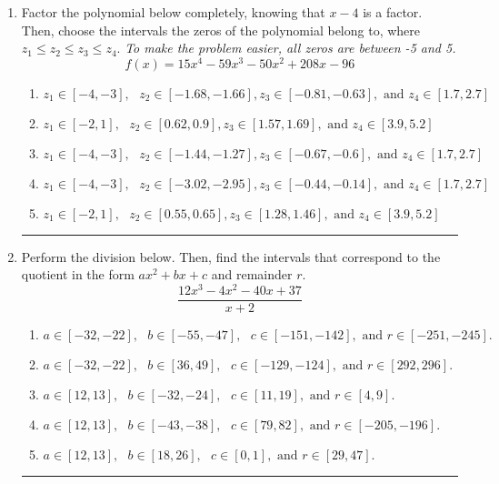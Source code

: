 \documentclass[14pt]{extbook}
\newcommand{\litem}[1]{\item#1\hspace*{-1cm}\rule{\textwidth}{0.4pt}}
\begin{document}
\begin{enumerate}
{\begin{enumerate}[label=\Alph*.]
\end{enumerate} }
\litem{
Factor the polynomial below completely, knowing that $x -4$ is a factor. Then, choose the intervals the zeros of the polynomial belong to, where $z_1 \leq z_2 \leq z_3 \leq z_4$. \textit{To make the problem easier, all zeros are between -5 and 5.}\[ f(x) = 15x^{4} -59 x^{3} -50 x^{2} +208 x -96 \]\begin{enumerate}[label=\Alph*.]
\item \( z_1 \in [-4, -3], \text{   }  z_2 \in [-1.68, -1.66], z_3 \in [-0.81, -0.63], \text{   and   } z_4 \in [1.7, 2.7] \)
\item \( z_1 \in [-2, 1], \text{   }  z_2 \in [0.62, 0.9], z_3 \in [1.57, 1.69], \text{   and   } z_4 \in [3.9, 5.2] \)
\item \( z_1 \in [-4, -3], \text{   }  z_2 \in [-1.44, -1.27], z_3 \in [-0.67, -0.6], \text{   and   } z_4 \in [1.7, 2.7] \)
\item \( z_1 \in [-4, -3], \text{   }  z_2 \in [-3.02, -2.95], z_3 \in [-0.44, -0.14], \text{   and   } z_4 \in [1.7, 2.7] \)
\item \( z_1 \in [-2, 1], \text{   }  z_2 \in [0.55, 0.65], z_3 \in [1.28, 1.46], \text{   and   } z_4 \in [3.9, 5.2] \)

\end{enumerate} }
\litem{
Perform the division below. Then, find the intervals that correspond to the quotient in the form $ax^2+bx+c$ and remainder $r$.\[ \frac{12x^{3} -4 x^{2} -40 x + 37}{x + 2} \]\begin{enumerate}[label=\Alph*.]
\item \( a \in [-32, -22], \text{   } b \in [-55, -47], \text{   } c \in [-151, -142], \text{   and   } r \in [-251, -245]. \)
\item \( a \in [-32, -22], \text{   } b \in [36, 49], \text{   } c \in [-129, -124], \text{   and   } r \in [292, 296]. \)
\item \( a \in [12, 13], \text{   } b \in [-32, -24], \text{   } c \in [11, 19], \text{   and   } r \in [4, 9]. \)
\item \( a \in [12, 13], \text{   } b \in [-43, -38], \text{   } c \in [79, 82], \text{   and   } r \in [-205, -196]. \)
\item \( a \in [12, 13], \text{   } b \in [18, 26], \text{   } c \in [0, 1], \text{   and   } r \in [29, 47]. \)


\end{enumerate}}
\end{enumerate}
\end{document}
